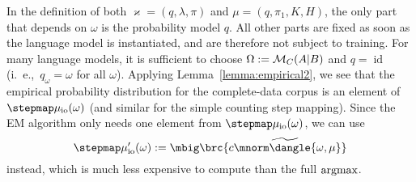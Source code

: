 In the definition of both $\varkappa=(q,\lambda,\pi)$ and $\mu=(q,\pi_1,K,H)$,
the only part that depends on $\omega$ is the probability model $q$. All other
parts are fixed as soon as the language model is instantiated, and are
therefore not subject to training. For many language models, it is sufficient
to choose $\Omega := \mathcal M_C(A|B)$ and $q = \operatorname{id}$ (i.~e.,~$q_\omega =
\omega$ for all $\omega$).  Applying Lemma~\ref{lemma:empirical2}, we see that
the empirical probability distribution for the complete-data corpus is an
element of $\stepmap\mu_\mathrm{io}(\omega)$ (and similar for the simple
counting step mapping). Since the EM algorithm only needs one element from
$\stepmap\mu_\mathrm{io}(\omega)$, we can use
\[
 \stepmap\mu'_\mathrm{io}(\omega) := \mbig\brc{ \widetilde{c\mnorm\dangle{\omega,\mu}} }
\]
instead, which is much less expensive to compute than the full $\argmax$.
